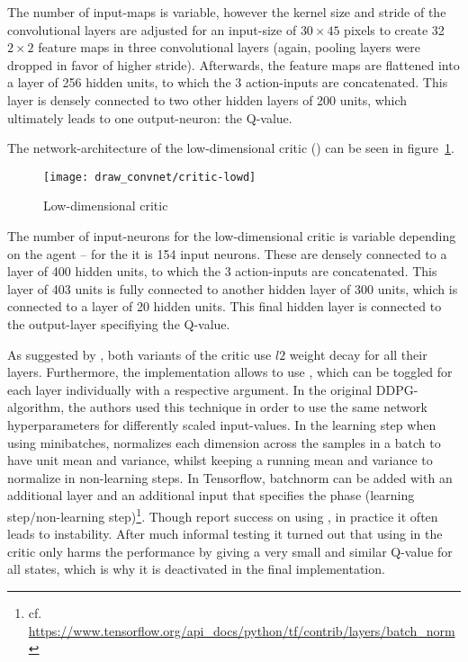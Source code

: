 The number of input-maps is variable, however the kernel size and stride of the convolutional layers are adjusted for an input-size of $30\times45$ pixels to create 32 $2\times2$ feature maps in three convolutional layers (again, pooling layers were dropped in favor of higher stride).  Afterwards, the feature maps are flattened into a layer of 256 hidden units, to which the 3 action-inputs are concatenated. This layer is densely connected to two other hidden layers of 200 units, which ultimately leads to one output-neuron: the Q-value.

The network-architecture of the low-dimensional critic () can be seen in figure~\ref{fig:lowdcrit}.

\begin{figure}[h]
	\centering 
	\texttt{[image: draw\_convnet/critic-lowd]}
	\caption{Low-dimensional critic}
	\label{fig:lowdcrit}
\end{figure}

The number of input-neurons for the low-dimensional critic is variable depending on the agent -- for the  it is 154 input neurons. These are densely connected to a layer of 400 hidden units, to which the 3 action-inputs are concatenated. This layer of 403 units is fully connected to another hidden layer of 300 units, which is connected to a layer of 20 hidden units. This final hidden layer is connected to the output-layer specifiying the Q-value.

As suggested by \cite{lillicrap_continuous_2015}, both variants of the critic use $l2$ weight decay for all their layers. Furthermore, the implementation allows to use \cite{ioffe_batch_2015}, which can be toggled for each layer individually with a respective argument. In the original DDPG-algorithm, the authors used this technique in order to use the same network hyperparameters for differently scaled input-values. In the learning step when using minibatches, \batchnorm normalizes each dimension across the samples in a batch to have unit mean and variance, whilst keeping a running mean and variance to normalize in non-learning steps. In Tensorflow, batchnorm can be added with an additional layer and an additional input that specifies the phase (learning step/non-learning step)\footnote{cf. \url{https://www.tensorflow.org/api\_docs/python/tf/contrib/layers/batch_norm}}. Though \cite{lillicrap_continuous_2015} report success on using \batchnorm, in practice it often leads to instability. After much informal testing it turned out that using \batchnorm in the critic only harms the performance by giving a very small and similar Q-value for all states, which is why it is deactivated in the final implementation.


